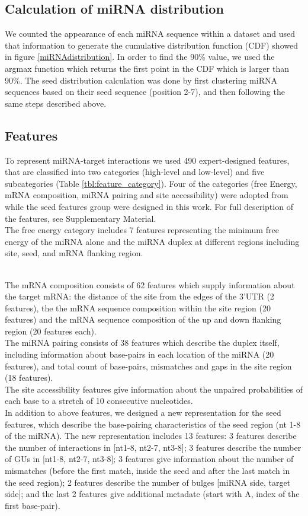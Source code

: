 \documentclass{bmcart}
\begin{document}
\subsection*{Calculation of miRNA distribution} \label{miRNAdistribution}
We counted the appearance of each miRNA sequence within a dataset and used that information to generate the cumulative distribution function (CDF) showed in figure \ref{miRNAdistribution}. In order to find the 90\% value, we used the argmax function which returns the first point in the CDF which is larger than 90\%.
The seed distribution calculation was done by first clustering miRNA sequences based on their seed sequence (position 2-7), and then following the same steps described above.

\subsection*{Features} \label{methods_features}
To represent miRNA-target interactions we used 490 expert-designed features, that are classified into two categories (high-level and low-level) and five subcategories (Table \ref{tbl:feature_category}). Four of the categories (free Energy, mRNA composition, miRNA pairing and site accessibility) were adopted from \cite{wen2018deepmirtar} while the seed features group were designed in this work. For full description of the features, see Supplementary Material.  
\\ The free energy category includes 7 features representing the minimum free energy of the miRNA alone and the miRNA duplex at different regions including site, seed, and mRNA flanking region.

\\ The mRNA composition consists of 62 features which supply information about the target mRNA: the distance of the site from the edges of the 3'UTR (2 features), the the mRNA sequence composition within the site region (20 features) and the mRNA sequence composition of the up and down flanking region (20 features each). 
\\ The miRNA pairing consists of 38 features which describe the duplex itself, including information about base-pairs in each location of the miRNA (20 features), and total count of base-pairs, mismatches and gaps in the site region (18 features).
\\ The site accessibility features give information about the unpaired probabilities of each base to a stretch of 10 consecutive nucleotides. 
\\ In addition to above features, we designed a new representation for the seed features, which describe the base-pairing characteristics of the seed region (nt 1-8 of the miRNA). The new representation includes 13 features: 3 features describe the number of interactions in [nt1-8, nt2-7, nt3-8]; 3 features describe the number of GUs in [nt1-8, nt2-7, nt3-8]; 3 features give information about the number of mismatches (before the first match, inside the seed and after the last match in the seed region); 2 features describe the number of bulges [miRNA side, target side]; and  the last 2 features give additional metadate (start with A, index of the first base-pair).
\end{document}

